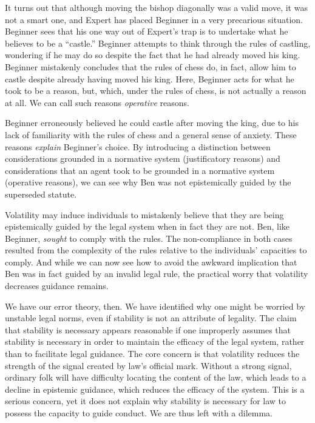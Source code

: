 It turns out that although moving the bishop diagonally was a valid
move, it was not a smart one, and Expert has placed Beginner in a very
precarious situation. Beginner sees that his one way out of Expert's
trap is to undertake what he believes to be a ``castle.'' Beginner
attempts to think through the rules of castling, wondering if he may do
so despite the fact that he had already moved his king. Beginner
mistakenly concludes that the rules of chess do, in fact, allow him to
castle despite already having moved his king. Here, Beginner acts for
what he took to be a reason, but, which, under the rules of chess, is
not actually a reason at all. We can call such reasons \emph{operative}
reasons.

Beginner erroneously believed he could castle after moving the king, due
to his lack of familiarity with the rules of chess and a general sense
of anxiety. These reasons \emph{explain} Beginner's choice. By
introducing a distinction between considerations grounded in a normative
system (justificatory reasons) and considerations that an agent took to
be grounded in a normative system (operative reasons), we can see why
Ben was not epistemically guided by the superseded statute.

Volatility may induce individuals to mistakenly believe that they are
being epistemically guided by the legal system when in fact they are
not. Ben, like Beginner, \emph{sought} to comply with the rules. The
non-compliance in both cases resulted from the complexity of the rules
relative to the individuals' capacities to comply. And while we can now
see how to avoid the awkward implication that Ben was in fact guided by
an invalid legal rule, the practical worry that volatility decreases
guidance remains.

We have our error theory, then. We have identified why one might be
worried by unstable legal norms, even if stability is not an attribute
of legality. The claim that stability is necessary appears reasonable if
one improperly assumes that stability is necessary in order to maintain
the efficacy of the legal system, rather than to facilitate legal
guidance. The core concern is that volatility reduces the strength of
the signal created by law's official mark. Without a strong signal,
ordinary folk will have difficulty locating the content of the law,
which leads to a decline in epistemic guidance, which reduces the
efficacy of the system. This is a serious concern, yet it does not
explain why stability is necessary for law to possess the capacity to
guide conduct. We are thus left with a dilemma.


